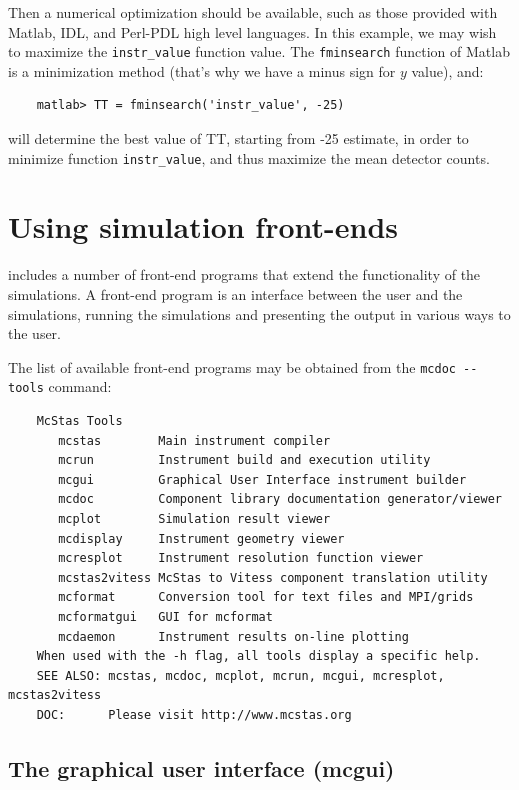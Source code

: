 Then a numerical optimization should be available, such as those provided with Matlab, IDL, and Perl-PDL high level languages. In this example, we may wish to maximize the \verb+instr_value+ function value. The \verb+fminsearch+ function of Matlab is a minimization method (that's why we have a minus sign for $y$ value), and:
\begin{lstlisting}
    matlab> TT = fminsearch('instr_value', -25)
\end{lstlisting}
will determine the best value of TT, starting from -25 estimate, in order to
minimize function \verb+instr_value+, and thus maximize the mean detector
counts.

\section{Using simulation front-ends}
\label{s:frontends}

\MCS includes a number of front-end programs that extend the
functionality of the simulations. A front-end program is an interface
between the user and the simulations, running the simulations and
presenting the output in various ways to the user.

The list of available \MCS front-end programs may be obtained from the
\verb+mcdoc --tools+ command:
\begin{lstlisting}
    McStas Tools
       mcstas        Main instrument compiler
       mcrun         Instrument build and execution utility
       mcgui         Graphical User Interface instrument builder
       mcdoc         Component library documentation generator/viewer
       mcplot        Simulation result viewer
       mcdisplay     Instrument geometry viewer
       mcresplot     Instrument resolution function viewer
       mcstas2vitess McStas to Vitess component translation utility
       mcformat      Conversion tool for text files and MPI/grids
       mcformatgui   GUI for mcformat
       mcdaemon      Instrument results on-line plotting
    When used with the -h flag, all tools display a specific help.
    SEE ALSO: mcstas, mcdoc, mcplot, mcrun, mcgui, mcresplot, mcstas2vitess
    DOC:      Please visit http://www.mcstas.org
\end{lstlisting}

\subsection{The graphical user interface (mcgui)}
\label{s:mcgui}

